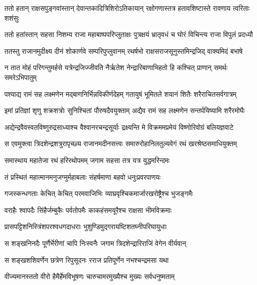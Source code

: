 
\twolineshloka
{ततो हतान् राक्षसपुङ्गवांस्तान् देवान्तकादित्रिशिरोऽतिकायान्}
{रक्षोगणास्तत्र हतावशिष्टास्ते रावणाय त्वरिताः शशंसुः} %

\twolineshloka
{ततो हतांस्तान् सहसा निशम्य राजा महाबाष्पपरिप्लुताक्षः}
{पुत्रक्षयं भ्रातृवधं च घोरं विचिन्त्य राजा विपुलं प्रदध्यौ} %

\twolineshloka
{ततस्तु राजानमुदीक्ष्य दीनं शोकार्णवे सम्परिपुप्लुवानम्}
{रथर्षभो राक्षसराजसूनुस्तमिन्द्रजिद् वाक्यमिदं बभाषे} %

\twolineshloka
{न तात मोहं परिगन्तुमर्हसे यत्रेन्द्रजिज्जीवति नैर्ऋतेश}
{नेन्द्रारिबाणाभिहतो हि कश्चित् प्राणान् समर्थः समरेऽभिपातुम्} %

\twolineshloka
{पश्याद्य रामं सह लक्ष्मणेन मद्बाणनिर्भिन्नविकीर्णदेहम्}
{गतायुषं भूमितले शयानं शितैः शरैराचितसर्वगात्रम्} %

\twolineshloka
{इमां प्रतिज्ञां शृणु शक्रशत्रोः सुनिश्चितां पौरुषदैवयुक्ताम्}
{अद्यैव रामं सह लक्ष्मणेन सन्तर्पयिष्यामि शरैरमोघैः} %

\twolineshloka
{अद्येन्द्रवैवस्वतविष्णुरुद्रसाध्याश्च वैश्वानरचन्द्रसूर्याः}
{द्रक्ष्यन्ति मे विक्रममप्रमेयं विष्णोरिवोग्रं बलियज्ञवाटे} %

\twolineshloka
{स एवमुक्त्वा त्रिदशेन्द्रशत्रुरापृच्छ्य राजानमदीनसत्त्वः}
{समारुरोहानिलतुल्यवेगं रथं खरश्रेष्ठसमाधियुक्तम्} %

\twolineshloka
{समास्थाय महातेजा रथं हरिरथोपमम्}
{जगाम सहसा तत्र यत्र युद्धमरिन्दमः} %

\twolineshloka
{तं प्रस्थितं महात्मानमनुजग्मुर्महाबलाः}
{संहर्षमाणा बहवो धनुःप्रवरपाणयः} %

\twolineshloka
{गजस्कन्धगताः केचित् केचित् परमवाजिभिः}
{व्याघ्रवृश्चिकमार्जारखरोष्ट्रैश्च भुजङ्गमैः} %

\twolineshloka
{वराहैः श्वापदैः सिंहैर्जम्बुकैः पर्वतोपमैः}
{काकहंसमयूरैश्च राक्षसा भीमविक्रमाः} %

\twolineshloka
{प्रासपट्टिशनिस्त्रिंशपरश्वधगदाधराः}
{भुशुण्डिमुद्गरायष्टिशतघ्नीपरिघायुधाः} %

\twolineshloka
{स शङ्खनिनदैः पूर्णैर्भेरीणां चापि निःस्वनैः}
{जगाम त्रिदशेन्द्रारिराजिं वेगेन वीर्यवान्} %

\twolineshloka
{स शङ्खशशिवर्णेन छत्रेण रिपुसूदनः}
{रराज प्रतिपूर्णेन नभश्चन्द्रमसा यथा} %

\twolineshloka
{वीज्यमानस्ततो वीरो हैमैर्हेमविभूषणः}
{चारुचामरमुख्यैश्च मुख्यः सर्वधनुष्मताम्} %

